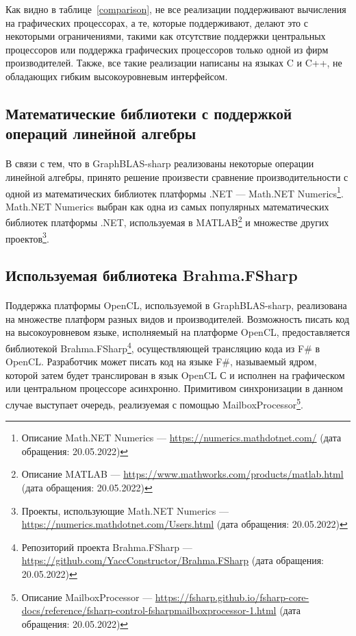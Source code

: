 \documentclass[14pt]{matmex-diploma-custom}
\begin{document}
Как видно в таблице~\ref{comparison}, не все реализации поддерживают вычисления на графических процессорах, а те, которые поддерживают, делают это с некоторыми ограничениями, такими как отсутствие поддержки центральных процессоров или поддержка графических процессоров только одной из фирм производителей. Также, все такие реализации написаны на языках C и C++, не обладающих гибким высокоуровневым интерфейсом.

\subsection{Математические библиотеки с поддержкой операций линейной алгебры}
\paragraph{} В связи с тем, что в GraphBLAS-sharp реализованы некоторые операции линейной алгебры, принято решение произвести сравнение производительности с одной из математических библиотек платформы .NET --- Math.NET Numerics\footnote{Описание Math.NET Numerics --- \url{https://numerics.mathdotnet.com/} (дата обращения: 20.05.2022)}. Math.NET Numerics выбран как одна из самых популярных математических библиотек платформы .NET, используемая в MATLAB\footnote{Описание MATLAB --- \url{https://www.mathworks.com/products/matlab.html} (дата обращения: 20.05.2022)} и множестве других проектов\footnote{Проекты, использующие Math.NET Numerics --- \url{https://numerics.mathdotnet.com/Users.html} (дата обращения: 20.05.2022)}.

\subsection{Используемая библиотека Brahma.FSharp}
\paragraph{} Поддержка платформы OpenCL, используемой в GraphBLAS-sharp, реализована на множестве платформ разных видов и производителей. Возможность писать код на высокоуровневом языке, исполняемый на платформе OpenCL, предоставляется библиотекой Brahma.FSharp\footnote{Репозиторий проекта Brahma.FSharp --- \url{https://github.com/YaccConstructor/Brahma.FSharp} (дата обращения: 20.05.2022)}, осуществляющей трансляцию кода из F\# в OpenCL. Разработчик может писать код на языке F\#, называемый ядром, которой затем будет транслирован в язык OpenCL С и исполнен на графическом или центральном процессоре асинхронно. Примитивом синхронизации в данном случае выступает очередь, реализуемая с помощью MailboxProcessor\footnote{Описание MailboxProcessor --- \url{https://fsharp.github.io/fsharp-core-docs/reference/fsharp-control-fsharpmailboxprocessor-1.html} (дата обращения: 20.05.2022)}.
\end{document}
